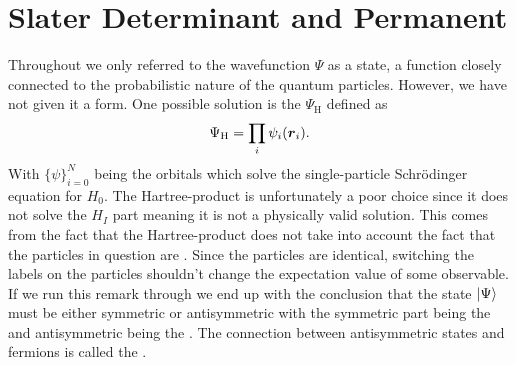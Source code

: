\section{Slater Determinant and Permanent}
    Throughout  we only referred to the wavefunction $\Psi$ as a
    state, a function closely connected to the probabilistic nature of the
    quantum particles. However, we have not given it a form. One possible
    solution is the  $\Psi_{\text{H}}$ defined as
        \begin{equation}
            \Psi_{\text{H}} = \prod_i\psi_i(\boldsymbol{{r}}_i).
        \end{equation}
    With $\{\psi\}_{i=0}^N$ being the orbitals which solve the single-particle
    Schrödinger equation for $H_0$. The Hartree-product is unfortunately a poor
    choice since it does not solve the $H_I$ part meaning it is not a
    physically valid solution. This comes from the fact that the
    Hartree-product does not take into account the fact that the particles in
    question are . Since the particles are
    identical, switching the labels on the particles shouldn't change the
    expectation value of some observable. If we run this remark through we
    end up with the conclusion that the state $\ket{\Psi}$ must be either
    symmetric or antisymmetric with the symmetric part being the  and antisymmetric being the . The connection
    between antisymmetric states and fermions is called the .

